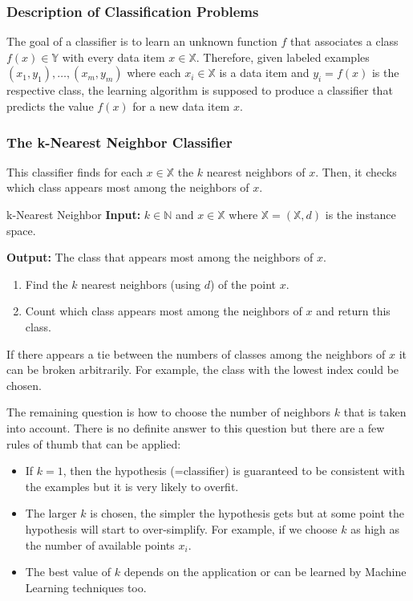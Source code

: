 \documentclass[english]{panikzettel}
\begin{document}
\subsubsection{Description of Classification Problems}
The goal of a classifier is to learn an unknown function $f$ that associates a class $f(x)\in\mathbb{Y}$ with every data item $x\in \mathbb{X}$. Therefore, given labeled examples $(x_1,y_1),\ldots,(x_m,y_m)$ where each $x_i\in\mathbb{X}$ is a data item and $y_i=f(x)$ is the respective class, the learning algorithm is supposed to produce a classifier that predicts the value $f(x)$ for a new data item $x$.

\subsubsection{The k-Nearest Neighbor Classifier}
This classifier finds for each $x\in\mathbb{X}$ the $k$ nearest neighbors of $x$. Then, it checks which class appears most among the neighbors of $x$.

\begin{algo}{k-Nearest Neighbor}
\textbf{Input:} $k\in\mathbb{N}$ and $x\in \mathbb{X}$ where $\mathbb{X}=(\mathbb{X}, d)$ is the instance space.

\textbf{Output:} The class that appears most among the neighbors of $x$.
\tcblower
\begin{enumerate}
\item Find the $k$ nearest neighbors (using $d$) of the point $x$.
\item Count which class appears most among the neighbors of $x$ and return this class.
\end{enumerate}
\end{algo}

If there appears a tie between the numbers of classes among the neighbors of $x$ it can be broken arbitrarily. For example, the class with the lowest index could be chosen.

The remaining question is how to choose the number of neighbors $k$ that is taken into account. There is no definite answer to this question but there are a few rules of thumb that can be applied:
\begin{itemize}
\item If $k=1$, then the hypothesis (=classifier) is guaranteed to be consistent with the examples but it is very likely to overfit.
\item The larger $k$ is chosen, the simpler the hypothesis gets but at some point the hypothesis will start to over-simplify. For example, if we choose $k$ as high as the number of available points $x_i$.
\item The best value of $k$ depends on the application or can be learned by Machine Learning techniques too.
\end{itemize}
\end{document}
